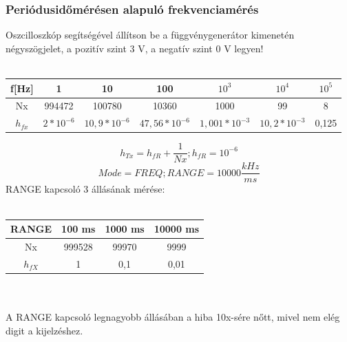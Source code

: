 \documentclass[10pt,a4paper]{article}
\begin{document}
		\subsubsection{Periódusidőmérésen alapuló frekvenciamérés}
		Oszcilloszkóp segítségével állítson be a függvénygenerátor kimenetén
négyszögjelet, a pozitív szint 3 V, a negatív szint 0 V legyen!
		\\\\
		\begin{tabular}{|c|c|c|c|c|c|c|}
		\hline 
		f[Hz] & 1 & 10 & 100 & $10^3$ & $10^4$ & $10^5$ \\ 
		\hline 
		Nx & 994472 & 100780 & 10360 & 1000 & 99 & 8 \\ 
		\hline 
		$h_{fx}$ & $2*10^{-6}$ & $10,9*10^{-6}$ & $47,56*10^{-6}$ & $1,001*10^{-3}$ & $10,2*10^{-3}$ & 0,125 \\ 
		\hline 
		\end{tabular} 
		$$h_{Tx} = h_{fR} + \frac{1}{Nx}; h_{fR} = 10^{-6}$$
		$$Mode=FREQ; RANGE=10000 \frac{kHz}{ms}$$
		RANGE kapcsoló 3 állásának mérése:\\\\
		\begin{tabular}{|c|c|c|c|}
		\hline 
		RANGE & 100 ms & 1000 ms & 10000 ms \\ 
		\hline 
		Nx & 999528 & 99970 & 9999 \\ 
		\hline 
		$h_{fX}$ & 1 & 0,1 & 0,01 \\ 
		\hline 
		\end{tabular} 
		\\\\A RANGE kapcsoló legnagyobb állásában a hiba 10x-sére nőtt, mivel nem elég digit a kijelzéshez.
\end{document}
